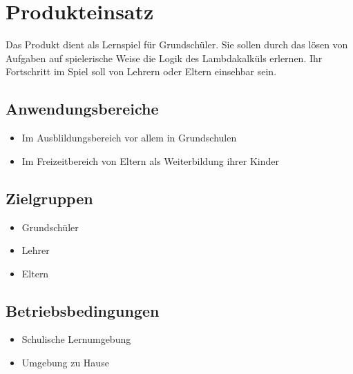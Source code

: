 \section{Produkteinsatz}

Das Produkt dient als Lernspiel für Grundschüler. Sie sollen durch das lösen von Aufgaben auf spielerische Weise die Logik des Lambdakalküls erlernen. Ihr Fortschritt im Spiel soll von Lehrern oder Eltern einsehbar sein.

\subsection{Anwendungsbereiche}
\begin{itemize}
	\item Im Ausblildungsbereich vor allem in Grundschulen
	\item Im Freizeitbereich von Eltern als Weiterbildung ihrer Kinder
\end{itemize}


\subsection{Zielgruppen}

\begin{itemize}
	\item Grundschüler
	\item Lehrer
	\item Eltern
\end{itemize}

\subsection{Betriebsbedingungen}
\begin{itemize}
	\item Schulische Lernumgebung
	\item Umgebung zu Hause
\end{itemize}
